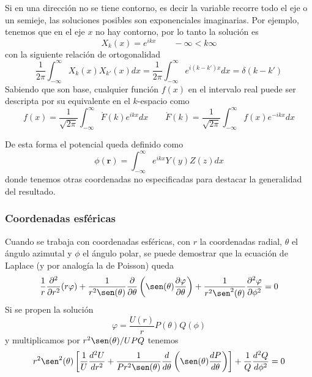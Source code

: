 \documentclass[a4paper]{article}
\numberwithin{equation}{section} %
\renewcommand{\vec}[1]{\boldsymbol{#1}}
\begin{document}
Si en una dirección no se tiene contorno, es decir la variable recorre todo el eje o un semieje, las soluciones posibles son exponenciales imaginarias. Por ejemplo, tenemos que en el eje $x$ no hay contorno, por lo tanto la solución es
\begin{equation}
 X_k(x) = e^{i k x} \qquad -\infty < k \infty
\end{equation}
con la siguiente relación de ortogonalidad
\begin{equation}
 \frac{1}{2\pi} \int_{-\infty}^{\infty} X_k(x) X_{k'}(x) dx = \frac{1}{2\pi} \int_{-\infty}^{\infty} e^{i (k - k') x} dx = \delta(k - k') 
\end{equation}
Sabiendo que son base, cualquier función $f(x)$ en el intervalo real puede ser descripta por su equivalente en el $k$-espacio como
\begin{equation}
f(x) = \frac{1}{\sqrt{2\pi}} \int_{-\infty}^{\infty} \acute{F}(k) e^{i k x} dx \qquad \acute{F}(k) = \frac{1}{\sqrt{2\pi}} \int_{-\infty}^{\infty} f(x) e^{-i k x} dx
\end{equation}

De esta forma el potencial queda definido como
\begin{equation}
\phi(\vec{r}) = \int_{-\infty}^{\infty} e^{i k x} Y(y) Z(z) dx
\end{equation}
donde tenemos otras coordenadas no especificadas para destacar la generalidad del resultado.


\subsubsection{Coordenadas esféricas}
Cuando se trabaja con coordenadas esféricas, con $r$ la coordenadas radial, $\theta$ el ángulo azimutal y $\phi$ el ángulo polar, se puede demostrar que la ecuación de Laplace (y por analogía la de Poisson) queda
\begin{equation}
\frac{1}{r} \frac{\partial^2}{\partial r^2} (r \varphi) + \frac{1}{r^2 \sen(\theta)} \frac{\partial}{\partial \theta} \left( \sen(\theta) \frac{\partial \varphi}{\partial \theta}\right) + \frac{1}{r^2 \sen^2(\theta)} \frac{\partial^2 \varphi}{\partial \phi^2}  = 0
\label{eq:electroestatica_laplace_esfericas}
\end{equation}
Si se propen la solución
\begin{equation}
\varphi = \frac{U(r)}{r} P(\theta) Q(\phi)
\end{equation}
y multiplicamos por $r^2 \sen(\theta) / U P Q$ tenemos
\begin{equation}
r^2 \sen^2(\theta) \left[ \frac{1}{U} \frac{d^2 U}{d r^2} + \frac{1}{P r^2 \sen(\theta)} \frac{d}{d\theta} \left( \sen(\theta) \frac{d P}{d\theta}\right)\right] + \frac{1}{Q} \frac{d^2 Q}{d \phi^2} = 0
\end{equation}
\end{document}
